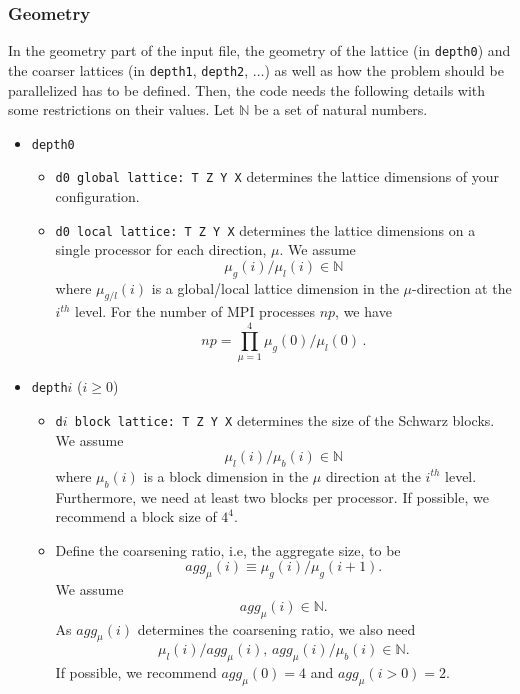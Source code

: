 \documentclass[a4paper,12pt]{scrartcl}
\begin{document}
\subsubsection{Geometry}
In the geometry part of the input file, the geometry of the lattice (in \texttt{depth0}) and the coarser lattices (in \texttt{depth1}, \texttt{depth2}, $\ldots$) as well as how the problem should be parallelized has to be defined.  Then, the code needs the following details with some restrictions on their values.  Let $\mathbb{N}$ be a set of natural numbers.
\begin{itemize}
\item \texttt{depth0}
  \begin{itemize}
    \item \texttt{d0 global lattice:~T Z Y X} determines the lattice dimensions of your configuration.
    \item \texttt{d0 local lattice:~T Z Y X} determines the lattice dimensions on a single processor for each direction, $\mu$.  We assume
    \begin{equation*}
    \mu_g(i)/\mu_l(i) \in \mathbb{N} 
    \end{equation*}
     where $\mu_{g/l}(i)$ is a global/local lattice dimension in the $\mu$-direction at the $i^{ th}$ level.
     For the number of MPI processes $np$, we have
       $$ np = \prod_{\mu=1}^4 \mu_g(0)/\mu_l(0) \, . $$
  \end{itemize}
\item \texttt{depth$i$} ($i \geq 0$)
  \begin{itemize}
    \item \texttt{d$i$ block lattice:~T Z Y X} determines the size of the Schwarz blocks. We assume 
\begin{equation*}
\mu_l(i)/\mu_b(i)\in \mathbb{N}
\end{equation*}    
     where $\mu_b(i)$ is a block dimension in the $\mu$ direction at the $i^{th}$ level.  Furthermore, we need at least two blocks per processor. If possible, we recommend a block size of $4^4$.
    \item Define the coarsening ratio, i.e, the aggregate size, to be $$agg_\mu(i)\equiv \mu_g(i)/\mu_g(i+1).$$  We assume $$agg_\mu(i) \in \mathbb{N}.$$  As $agg_\mu(i)$ determines the coarsening ratio, we also need
    \begin{equation*}
    \mu_l(i)/agg_\mu(i),\, agg_\mu(i)/ \mu_b(i) \in \mathbb{N}.
    \end{equation*}
    If possible, we recommend $agg_\mu(0)=4$ and $agg_\mu(i>0)=2$. 

\end{itemize}
\end{itemize}
\end{document}
